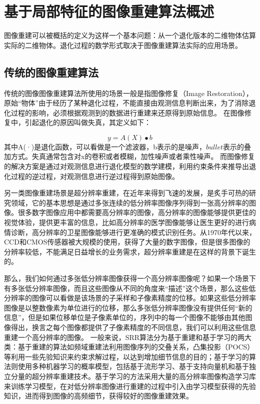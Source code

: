 

\chapter{基于局部特征的图像重建算法概述}

图像重建可以被概括的定义为这样一个基本问题：从一个退化版本的二维物体估算实际的二维物体\cite{Li:2008vn}。退化过程的数学形式取决于图像重建算法实际的应用场景。


\section{传统的图像重建算法}
传统的图像图像重建算法所使用的场景一般是指图像修复（Image Restoration），原始“物体”由于经历了某种退化过程，不能直接由观测信息判断出来，为了消除退化过程的影响，必须根据观测到的数据进行重建来还原得到原始信息。
在图像修复中，引起退化的原因叫做失真，其定义如下：

\begin{equation}
y = A(X) \bullet b
\end{equation}
其中A(·)是退化函数，可以看做是一个滤波器，b表示的是噪声，\(bullet\)表示的叠加方式。失真通常包含对x的卷积或者模糊，加性噪声或者乘性噪声。
而图像修复的解决方案是通过对观测信息进行退化模型的数学建模，利用约束条件来推导出退化过程的逆过程，对观测信息进行逆过程得到原始图像。

另一类图像重建场景是超分辨率重建，在近年来得到飞速的发展，是炙手可热的研究领域，它的基本思想是通过多张连续的低分辨率图像序列得到一张高分辨率的图像。很多数字图像应用中都需要高分辨率的图像，高分辨率的图像能够提供更佳的视觉体验，提供更丰富的信息，比如高分辨率的医学图像能够让医生更好的进行病情诊断，高分辨率的卫星图像能够进行更准确的模式识别任务。从1970年代以来，CCD和CMOS传感器被大规模的使用，获得了大量的数字图像，但是很多图像的分辨率较低，不能满足日益增长的业务需求，超分辨率重建是在这样的背景下诞生的。

那么，我们如何通过多张低分辨率图像获得一个高分辨率图像呢？如果一个场景下有多张低分辨率图像，而且这些图像从不同的角度来“描述”这个场景，那么这些低分辨率的图像可以看做是该场景的子采样和子像素精度的位移。如果这些低分辨率图像是以整数像素为单位进行的位移，那么多张低分辨率图像没有提供任何“新的信息”，但是如果位移单位是子像素单位的，序列中的每一个图像不能够由其他图像得出，换言之每个图像都提供了子像素精度的不同信息，我们可以利用这些信息重建一个高分辨率的图像。
一般来说，SRR算法分为基于重建和基于学习的两大类：基于重建的算法如频域重建法利用图像序列的交叠关系，凸集投影（POCS）等利用一些先验知识来约束求解过程，以达到增加细节信息的目的；基于学习的算法则使用多种机器学习的概率模型，包括基于流形学习、基于支持向量机和基于独立分量的超分辨率重建技术。基于学习的方法采用大量的高分辨率图像构造学习库来训练学习模型，在对低分辨率图像进行重建的过程中引入由学习模型获得的先验知识，进而得到图像的高频细节，获得较好的图像重建效果。

